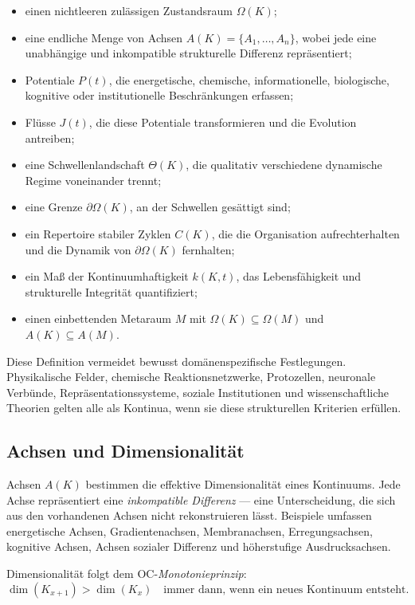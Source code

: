 \begin{itemize}
    \item einen nichtleeren zulässigen Zustandsraum \(\Omega(K)\);
    \item eine endliche Menge von Achsen \(A(K)=\{A_1,\dots,A_n\}\), wobei jede eine unabhängige und inkompatible strukturelle Differenz repräsentiert;
    \item Potentiale \(P(t)\), die energetische, chemische, informationelle, biologische, kognitive oder institutionelle Beschränkungen erfassen;
    \item Flüsse \(J(t)\), die diese Potentiale transformieren und die Evolution antreiben;
    \item eine Schwellenlandschaft \(\Theta(K)\), die qualitativ verschiedene dynamische Regime voneinander trennt;
    \item eine Grenze \(\partial\Omega(K)\), an der Schwellen gesättigt sind;
    \item ein Repertoire stabiler Zyklen \(C(K)\), die die Organisation aufrechterhalten und die Dynamik von \(\partial\Omega(K)\) fernhalten;
    \item ein Maß der Kontinuumhaftigkeit \(k(K,t)\), das Lebensfähigkeit und strukturelle Integrität quantifiziert;
    \item einen einbettenden Metaraum \(M\) mit \(\Omega(K)\subseteq\Omega(M)\) und \(A(K)\subseteq A(M)\).
\end{itemize}

Diese Definition vermeidet bewusst domänenspezifische Festlegungen.
Physikalische Felder, chemische Reaktionsnetzwerke, Protozellen, neuronale Verbünde, Repräsentationssysteme, soziale Institutionen und wissenschaftliche Theorien gelten alle als Kontinua, wenn sie diese strukturellen Kriterien erfüllen.

\subsection{Achsen und Dimensionalität}

Achsen \(A(K)\) bestimmen die effektive Dimensionalität eines Kontinuums.
Jede Achse repräsentiert eine \emph{inkompatible Differenz} --- eine Unterscheidung, die sich aus den vorhandenen Achsen nicht rekonstruieren lässt.
Beispiele umfassen energetische Achsen, Gradientenachsen, Membranachsen, Erregungsachsen, kognitive Achsen, Achsen sozialer Differenz und höherstufige Ausdrucksachsen.

Dimensionalität folgt dem OC-\emph{Monotonieprinzip}:
\[
\dim(K_{x+1}) > \dim(K_x)
\quad\text{immer dann, wenn ein neues Kontinuum entsteht}.
\]

